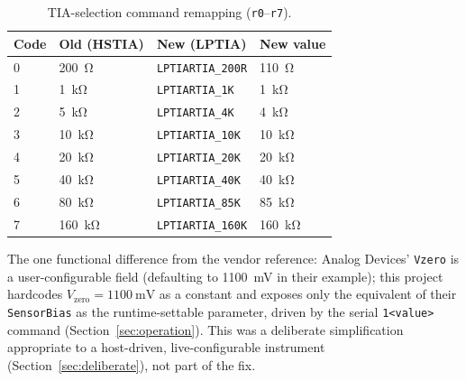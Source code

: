 \begin{table}[H]
\centering
\footnotesize
\setlength{\tabcolsep}{4pt}
\caption{TIA-selection command remapping (\texttt{r0}--\texttt{r7}).}
\label{tab:rtia}
\begin{tabular}{@{}p{0.9cm}p{2.3cm}p{2.6cm}p{1.7cm}@{}}
\toprule
Code & Old (HSTIA) & New (LPTIA) & New value \\
\midrule
0 & \SI{200}{\ohm}   & \texttt{LPTIARTIA\_200R} & \SI{110}{\ohm} \\
1 & \SI{1}{\kilo\ohm}  & \texttt{LPTIARTIA\_1K}   & \SI{1}{\kilo\ohm} \\
2 & \SI{5}{\kilo\ohm}  & \texttt{LPTIARTIA\_4K}   & \SI{4}{\kilo\ohm} \\
3 & \SI{10}{\kilo\ohm} & \texttt{LPTIARTIA\_10K}  & \SI{10}{\kilo\ohm} \\
4 & \SI{20}{\kilo\ohm} & \texttt{LPTIARTIA\_20K}  & \SI{20}{\kilo\ohm} \\
5 & \SI{40}{\kilo\ohm} & \texttt{LPTIARTIA\_40K}  & \SI{40}{\kilo\ohm} \\
6 & \SI{80}{\kilo\ohm} & \texttt{LPTIARTIA\_85K}  & \SI{85}{\kilo\ohm} \\
7 & \SI{160}{\kilo\ohm}& \texttt{LPTIARTIA\_160K} & \SI{160}{\kilo\ohm} \\
\bottomrule
\end{tabular}
\end{table}

The one functional difference from the vendor reference: Analog Devices'
\texttt{Vzero} is a user-configurable field (defaulting to \SI{1100}{\milli\volt}
in their example); this project hardcodes $V_{\mathrm{zero}}=\SI{1100}{\milli\volt}$
as a constant and exposes only the equivalent of their \texttt{SensorBias}
as the runtime-settable parameter, driven by the serial \texttt{1<value>}
command (Section~\ref{sec:operation}). This was a deliberate simplification
appropriate to a host-driven, live-configurable instrument
(Section~\ref{sec:deliberate}), not part of the fix.

